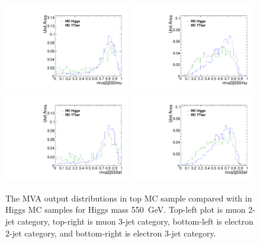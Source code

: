 \begin{figure}[!t]
  \centering
  \includegraphics[width=0.49\textwidth]{figs/cl-mva2j550mu-mvaTopvsHiggs.pdf}
  \includegraphics[width=0.49\textwidth]{figs/cl-mva3j550mu-mvaTopvsHiggs.pdf}
  \includegraphics[width=0.49\textwidth]{figs/cl-mva2j550el-mvaTopvsHiggs.pdf}
  \includegraphics[width=0.49\textwidth]{figs/cl-mva3j550el-mvaTopvsHiggs.pdf}
  \caption{\label{fig:mva:sigvsttbar-mva2j550}The MVA output
    distributions in top MC sample compared with in Higgs MC
    samples for Higgs mass 550~GeV. Top-left plot is muon 2-jet category,
    top-right is muon 3-jet category, bottom-left is electron 2-jet
    category, and bottom-right is electron 3-jet category. }
\end{figure}

